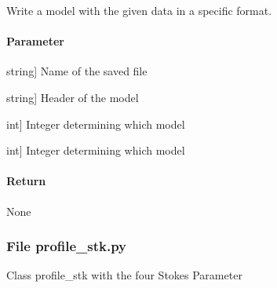 \documentclass[letterpaper,10pt,english]{sphinxmanual}
\begin{document}
\begin{fulllineitems}

\begin{fulllineitems}
\label{\detokenize{classes:id27}}
\pysigstartsignatures
{}
\pysigstopsignatures
\sphinxAtStartPar
Write a model with the given data in a specific format.


\paragraph{Parameter}
\label{\detokenize{classes:id28}}\begin{description}
\sphinxlineitem{filename}{[}string{]}
\sphinxAtStartPar
Name of the saved file

\sphinxlineitem{Header}{[}string{]}
\sphinxAtStartPar
Header of the model

\sphinxlineitem{x}{[}int{]}
\sphinxAtStartPar
Integer determining which model

\sphinxlineitem{y}{[}int{]}
\sphinxAtStartPar
Integer determining which model

\end{description}


\paragraph{Return}
\label{\detokenize{classes:id29}}
\sphinxAtStartPar
None

\end{fulllineitems}


\end{fulllineitems}



\subsubsection{File profile\_stk.py}
\label{\detokenize{classes:file-profile-stk-py}}
\sphinxAtStartPar
Class profile\_stk with the four Stokes Parameter
\end{document}
